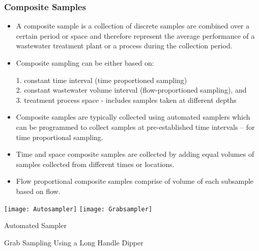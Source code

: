 \subsubsection{Composite Samples}
				\begin{itemize}
					\item A composite sample is a collection of discrete samples are combined over a certain period or space and therefore represent the average performance of a wastewater treatment plant or a process during the collection period.\\  
					\item Composite sampling can be either based on:
					      
					      1. constant time interval (time proportioned sampling)\\
					      2. constant wastewater volume interval (flow-proportioned sampling), and\\
					      3. treatment process space - includes samples taken at different depths\\
					      
					\item Composite samples are typically collected using automated samplers which can be programmed to collect samples at pre-established time intervals – for time proportional sampling.
					\item Time and space composite samples are collected by adding equal volumes of samples collected from different times or locations.  
					\item Flow proportional composite samples comprise of volume of each subsample based on flow.\\  
				\end{itemize}
				
			\begin{center}
				\texttt{[image: Autosampler]} \hspace{2cm} \texttt{[image: Grabsampler]}\\
			\end{center}
			\hspace{2.3cm} Automated Sampler \hspace{2.0cm} \parbox{\textwidth}{Grab Sampling Using a Long Handle Dipper}\\

